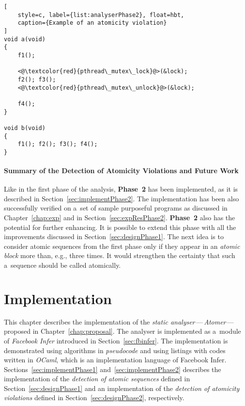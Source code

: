 \begin{lstlisting}[
    style=c, label={list:analyserPhase2}, float=hbt,
    caption={Example of an atomicity violation}
]
void a(void)
{
    f1();

    <@\textcolor{red}{pthread\_mutex\_lock}@>(&lock);
    f2(); f3();
    <@\textcolor{red}{pthread\_mutex\_unlock}@>(&lock);

    f4();
}

void b(void)
{
    f1(); f2(); f3(); f4();
}
\end{lstlisting}

\newpage
\subsubsection{%
    Summary of the Detection of Atomicity Violations and Future Work
}

Like in the first phase of the analysis, \textbf{Phase~2} has been
implemented, as it is described in Section~\ref{sec:implementPhase2}.
The implementation has been also successfully verified on a~set of 
sample purposeful programs as discussed in Chapter~\ref{chap:exp} and in
Section~\ref{sec:expResPhase2}. \textbf{Phase~2} also has the potential for 
further enhancing. It is possible to extend this phase with all the 
improvements discussed in Section~\ref{sec:designPhase1}. The next idea 
is to consider atomic sequences from the first phase only if they appear 
in an \emph{atomic block} more than, e.g., three times. It would strengthen 
the certainty that such a~sequence should be called atomically.



\chapter{Implementation}
\label{chap:implement}

This chapter describes the implementation of the \emph{static 
analyser}\,---\,\emph{Atomer}\,---\,proposed in Chapter~\ref{chap:proposal}. 
The analyser is implemented as a~module of \emph{Facebook Infer} introduced 
in Section~\ref{sec:fbinfer}. The implementation is demonstrated using
algorithms in \emph{pseudocode} and using listings with codes written 
in \emph{OCaml}, which is an implementation language of Facebook Infer.
Sections~\ref{sec:implementPhase1} and~\ref{sec:implementPhase2}
describes the implementation of the \emph{detection of atomic sequences} 
defined in Section~\ref{sec:designPhase1} and an implementation of the
\emph{detection of atomicity violations} defined in
Section~\ref{sec:designPhase2}, respectively.


